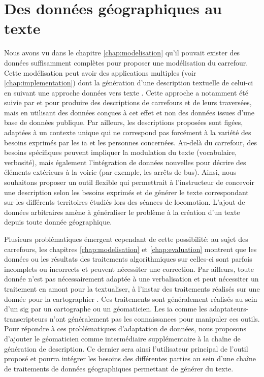 \section{Des données géographiques au texte}

\label{sec:description_geodata_to_text}

Nous avons vu dans le chapitre \ref{chap:modelisation} qu’il pouvait exister des données suffisamment complètes pour proposer une modélisation du carrefour. Cette modélisation peut avoir des applications multiples (voir \ref{chap:implementation}) dont la génération d’une description textuelle de celui-ci en suivant une approche données vers texte \citep{reiter-2007-architecture}. Cette approche a notamment été suivie par \citet{Guth2019} et \citet{balata2018} pour produire des descriptions de carrefours et de leurs traversées, mais en utilisant des données conçues à cet effet et non des données issues d’une base de données publique. Par ailleurs, les descriptions proposées sont figées, adaptées à un contexte unique qui ne correspond pas forcément à la variété des besoins exprimés par les \gls{ia} et les personnes concernées. Au-delà du carrefour, des besoins spécifiques peuvent impliquer la modulation du texte (vocabulaire, verbosité), mais également l’intégration de données nouvelles pour décrire des éléments extérieurs à la voirie (par exemple, les arrêts de bus). Ainsi, nous souhaitons proposer un outil flexible qui permettrait à l’instructeur de concevoir une description selon les besoins exprimés et de générer le texte correspondant sur les différents territoires étudiés lors des séances de locomotion. L’ajout de données arbitraires amène à généraliser le problème à la création d’un texte depuis toute donnée géographique.

\newpar{}

Plusieurs problématiques émergent cependant de cette possibilité: au sujet des carrefours, les chapitres \ref{chap:modelisation} et \ref{chap:evaluation} montrent que les données ou les résultats des traitements algorithmiques sur celles-ci sont parfois incomplets ou incorrects et peuvent nécessiter une correction. Par ailleurs, toute donnée n’est pas nécessairement adaptée à une verbalisation et peut nécessiter un traitement en amont pour la textualiser, à l’instar des traitements réalisés sur une donnée pour la cartographier \citep{mackaness2002}. Ces traitements sont généralement réalisés au sein d’un \gls{sig} par un cartographe ou un géomaticien. Les \gls{ia} comme les adaptateurs-transcripteurs n’ont généralement pas les connaissances pour manipuler ces outils. Pour répondre à ces problématiques d'adaptation de données, nous proposons d’ajouter le géomaticien comme intermédiaire supplémentaire à la chaîne de génération de description. Ce dernier sera ainsi l’utilisateur principal de l’outil proposé et pourra intégrer les besoins des différentes parties au sein d’une chaîne de traitements de données géographiques permettant de générer du texte.

